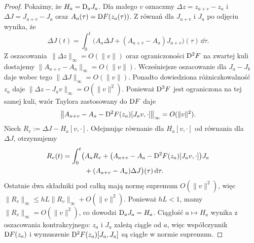\begin{proof}
Pokażmy, że $H_a=\mathrm D_aJ_a$. Dla małego $v$ oznaczmy
$\Delta z=z_{a+v}-z_a$ i $\Delta J=J_{a+v}-J_a$ oraz
$A_a(\tau)=\mathrm D F(z_a(\tau))$. Z równań dla $J_{a+v}$ i $J_a$
po odjęciu wynika, że
\[
\Delta J(t)=\int_0^t\bigl(A_a\Delta J
 +(A_{a+v}-A_a)J_{a+v}\bigr)(\tau)\,\dd\tau.
\]
Z oszacowania~$\|\Delta z\|_\infty=O(\|v\|)$ oraz
ograniczoności $\mathrm D^2F$ na zwartej kuli dostajemy
$\|A_{a+v}-A_a\|_\infty=O(\|v\|)$.
Wcześniejsze oszacowanie dla $J_a-J_b$ daje wobec tego
$\|\Delta J\|_\infty=O(\|v\|)$.
Ponadto dowiedziona różniczkowalność $z_a$ daje
$\|\Delta z-J_av\|_\infty=O(\|v\|^2)$.
Ponieważ $\mathrm D^3F$ jest ograniczona na tej samej kuli,
wzór Taylora zastosowany do $\mathrm D F$ daje
\[
\bigl\|A_{a+v}-A_a
 -\mathrm D^2F(z_a)[J_av,\cdot]\bigr\|_\infty
 =O(\|v\|^2).
\]
Niech $R_v:=\Delta J-H_a[v,\cdot]$.
Odejmując równanie dla $H_a[v,\cdot]$ od równania dla $\Delta J$,
otrzymujemy
\begin{align*}
R_v(t)=\int_0^t\bigl(&A_aR_v
 +\bigl(A_{a+v}-A_a-\mathrm D^2F(z_a)[J_av,\cdot]\bigr)J_a\\
 &+(A_{a+v}-A_a)\Delta J\bigr)(\tau)\,\mathrm d\tau.
\end{align*}
Ostatnie dwa składniki pod całką mają normę supremum
$O(\|v\|^2)$, więc
$\|R_v\|_\infty\leq hL\|R_v\|_\infty+O(\|v\|^2)$.
Ponieważ $hL<1$, mamy $\|R_v\|_\infty=O(\|v\|^2)$,
co dowodzi $\mathrm D_aJ_a=H_a$.
Ciągłość $a\mapsto H_a$ wynika z oszacowania kontrakcyjnego:
$z_a$ i $J_a$ zależą ciągle od $a$, więc współczynnik
$\mathrm D F(z_a)$ i wymuszenie $\mathrm D^2F(z_a)[J_a,J_a]$ są
ciągłe w normie supremum.


\end{proof}
